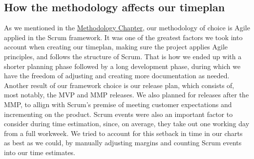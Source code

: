

\subsection{How the methodology affects our timeplan}
As we mentioned in the \hyperref[sec:Methodology]{Methodology Chapter}, our methodology of choice is Agile applied in the Scrum framework.
It was one of the greatest factors we took into account when creating our timeplan, making sure the project applies Agile principles,
and follows the structure of Scrum. That is how we ended up with a shorter planning phase followed by a long development phase, during which
we have the freedom of adjusting and creating more documentation as needed. Another result of our framework choice is our release plan,
which consists of, most notably, the MVP and MMP releases. We also planned for releases after the MMP, to allign with Scrum's premise
of meeting customer expectations and incrementing on the product.
Scrum events were also an important factor to consider during time estimation, since, on average, they take out one working day from 
a full workweek. We tried to account for this setback in time in our charts as best as we could, by manually adjusting margins and
counting Scrum events into our time estimates.

